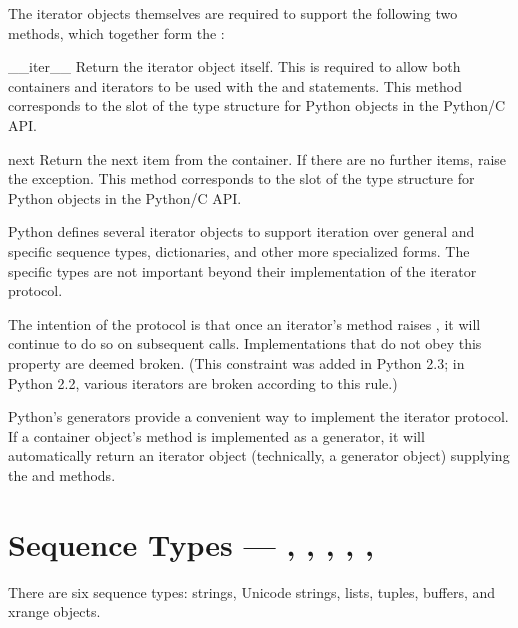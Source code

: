 The iterator objects themselves are required to support the following
two methods, which together form the :

\begin{methoddesc}[iterator]{__iter__}{}
  Return the iterator object itself.  This is required to allow both
  containers and iterators to be used with the  and
   statements.  This method corresponds to the
   slot of the type structure for Python objects in
  the Python/C API.
\end{methoddesc}

\begin{methoddesc}[iterator]{next}{}
  Return the next item from the container.  If there are no further
  items, raise the  exception.  This method
  corresponds to the  slot of the type structure
  for Python objects in the Python/C API.
\end{methoddesc}

Python defines several iterator objects to support iteration over
general and specific sequence types, dictionaries, and other more
specialized forms.  The specific types are not important beyond their
implementation of the iterator protocol.

The intention of the protocol is that once an iterator's
 method raises , it will
continue to do so on subsequent calls.  Implementations that
do not obey this property are deemed broken.  (This constraint
was added in Python 2.3; in Python 2.2, various iterators are
broken according to this rule.)

Python's generators provide a convenient way to implement the
iterator protocol.  If a container object's 
method is implemented as a generator, it will automatically
return an iterator object (technically, a generator object)
supplying the  and  methods.


\section{Sequence Types ---
	    , , ,
	    , , 
	    \label{typesseq}}

There are six sequence types: strings, Unicode strings, lists,
tuples, buffers, and xrange objects.

